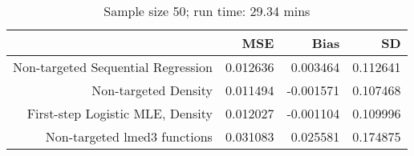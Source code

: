 \begin{table}[ht]
\centering
\caption{Sample size 50; run time: 29.34 mins} 
\begin{tabular}{rrrr}
  \hline
 & MSE & Bias & SD \\ 
  \hline
Non-targeted Sequential Regression & 0.012636 & 0.003464 & 0.112641 \\ 
  Non-targeted Density & 0.011494 & -0.001571 & 0.107468 \\ 
  First-step Logistic MLE, Density & 0.012027 & -0.001104 & 0.109996 \\ 
  Non-targeted lmed3 functions & 0.031083 & 0.025581 & 0.174875 \\ 
   \hline
\end{tabular}
\end{table}
